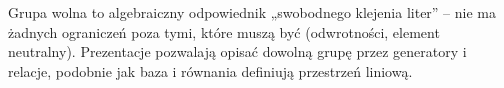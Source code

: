 \begin{intuition} 
 Grupa wolna to algebraiczny odpowiednik „swobodnego klejenia liter” – nie ma żadnych ograniczeń poza tymi, które muszą być (odwrotności, element neutralny). Prezentacje pozwalają opisać dowolną grupę przez generatory i relacje, podobnie jak baza i równania definiują przestrzeń liniową.
\end{intuition}
